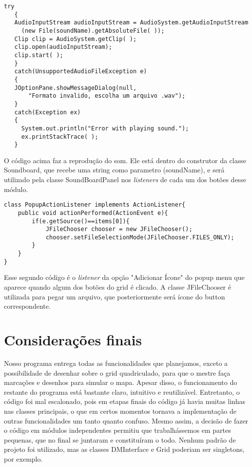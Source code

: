 \documentclass[
	article,			%
	11pt,				%
	oneside,			%
	a4paper,			%
	english,			%
	brazil,				%
	sumario=tradicional
	]{abntex2}
\begin{document}
    \begin{lstlisting}
try 
   {
   AudioInputStream audioInputStream = AudioSystem.getAudioInputStream
     (new File(soundName).getAbsoluteFile( ));
   Clip clip = AudioSystem.getClip( );
   clip.open(audioInputStream);
   clip.start( );
   }
   catch(UnsupportedAudioFileException e)
   {
   JOptionPane.showMessageDialog(null,
       "Formato invalido, escolha um arquivo .wav");
   }
   catch(Exception ex)
   {
     System.out.println("Error with playing sound.");
     ex.printStackTrace( );
   }
	\end{lstlisting}
	
    O código acima faz a reprodução do som. Ele está dentro do construtor da classe Soundboard, que recebe uma string como parametro (soundName), e será utilizado pela classe SoundBoardPanel nos \textit{listeners} de cada um dos botões desse módulo.

\hfill

    \begin{lstlisting}
class PopupActionListener implements ActionListener{
    public void actionPerformed(ActionEvent e){
	    if(e.getSource()==items[0]){
		    JFileChooser chooser = new JFileChooser();
		    chooser.setFileSelectionMode(JFileChooser.FILES_ONLY);
		} 
	}
}
    \end{lstlisting}
    
    Esse segundo código é o \textit{listener} da opção "Adicionar Ícone" do popup menu que aparece quando algum dos botões do grid é clicado. A classe JFileChooser é utilizada para pegar um arquivo, que posteriormente será ícone do button correspondente.
    
    
    


\section*{Considerações finais}

Nosso programa entrega todas as funcionalidades que planejamos, exceto a possibilidade de desenhar sobre o grid quadriculado, para que o mestre faça marcações e desenhos para simular o mapa. Apesar disso, o funcionamento do restante do programa está bastante claro, intuitivo e reutilizável. Entretanto, o código foi mal escalonado, pois em etapas finais do código já havia muitas linhas nas classes principais, o que em certos momentos tornava a implementação de outras funcionalidades um tanto quanto confuso. Mesmo assim, a decisão de fazer o código em módulos independentes permitiu que trabalhássemos em partes pequenas, que no final se juntaram e constituíram o todo. Nenhum padrão de projeto foi utilizado, mas as classes DMInterface e Grid poderiam ser singletons, por exemplo.
\end{document}
